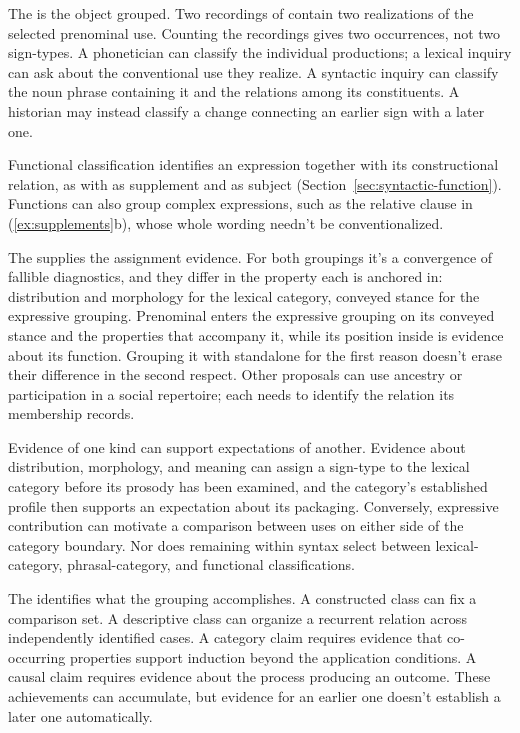 \documentclass[12pt]{article}
\begin{document}
The  is the object grouped. Two recordings of  contain two realizations of the selected prenominal
 use. Counting the recordings gives two occurrences, not
two sign-types. A phonetician can classify the individual productions;
a lexical inquiry can ask about the conventional use they realize.
A syntactic inquiry can classify the noun phrase containing it and
the relations among its constituents. A historian may instead classify
a change connecting an earlier sign with a later one.

Functional classification identifies an expression together with its
constructional relation, as with  as supplement and as
subject (Section~\ref{sec:syntactic-function}). Functions can also group complex expressions, such as the relative
clause in (\ref{ex:supplements}b), whose whole wording needn't be conventionalized.

The  supplies the assignment evidence. For both
groupings it's a convergence of fallible diagnostics, and they differ in
the property each is anchored in: distribution and morphology for the
lexical category, conveyed stance for the expressive grouping. Prenominal
 enters the expressive grouping on its conveyed stance and
the properties that accompany it, while its position inside  is evidence
about its function. Grouping it with standalone  for
the first reason doesn't erase their difference in the second respect.
Other proposals can use ancestry or participation in a social repertoire;
each needs to identify the relation its membership records.

Evidence of one kind can support expectations of another. Evidence about
distribution, morphology, and meaning can assign a sign-type to the lexical
category before its prosody has been examined, and the category's
established profile then supports an expectation about its packaging.
Conversely, expressive contribution can motivate a comparison between
 uses on either side of the category boundary. Nor does
remaining within syntax select between lexical-category, phrasal-category,
and functional classifications.

The  identifies what the grouping accomplishes. A
constructed class can fix a comparison set. A descriptive class can
organize a recurrent relation across independently identified cases.
A category claim requires evidence that co-occurring properties support
induction beyond the application conditions. A causal claim requires
evidence about the process producing an outcome. These achievements
can accumulate, but evidence for an earlier one doesn't establish a
later one automatically.
\end{document}
